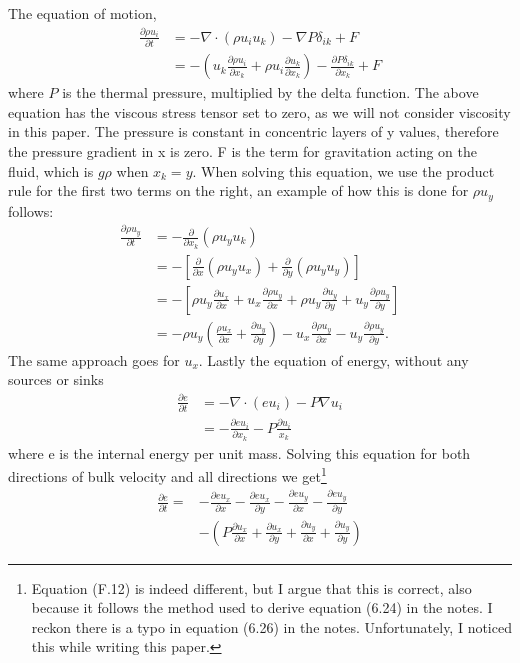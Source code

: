 \documentclass[a4paper,10pt]{article}
\begin{document}
The equation of motion, 
%
\begin{align}\label{eq:cons_motion}
\frac{\partial \rho u_i}{\partial t} &= -\nabla \cdot \left(\rho u_i u_k\right) - \nabla P\delta_{ik} + F \nonumber \\
&= -\left( u_k \frac{\partial \rho u_i}{\partial x_k} + \rho u_i \frac{\partial u_k}{\partial x_k} \right) -\frac{\partial P\delta_{ik}}{\partial x_k} + F
\end{align}
%
where $P$ is the thermal pressure, multiplied by the delta function. The above equation has the viscous stress tensor set to zero, as we will not consider viscosity in this paper. The pressure is constant in concentric layers of y values, therefore the pressure gradient in x is zero. F is the term for gravitation acting on the fluid, which is $g\rho$ when $x_k = y$. When solving this equation, we use the product rule for the first two terms on the right, an example of how this is done for $\rho u_y$ follows:
%
\begin{align*}
\frac{\partial \rho u_y}{\partial t} &= -\frac{\partial}{\partial x_k}\left(\rho u_y u_k\right) \nonumber \\
 &= -\left[\frac{\partial}{\partial x}\left(\rho u_y u_x\right) + \frac{\partial }{\partial y}\left(\rho u_y u_y\right)\right] \nonumber \\
 &= -\left[\rho u_y \frac{\partial u_x}{\partial x} + u_x\frac{\partial \rho u_y}{\partial x} + \rho u_y \frac{\partial u_y}{\partial y} + u_y \frac{\partial \rho u_y}{\partial y}\right] \nonumber \\
 &= -\rho u_y\left(\frac{\rho u_x}{\partial x} + \frac{\partial u_y}{\partial y}\right) - u_x \frac{\partial \rho u_y}{\partial x} - u_y \frac{\partial \rho u_y}{\partial y}.
\end{align*}
%
The same approach goes for $u_x$. Lastly the equation of energy, without any sources or sinks
%
\begin{align}\label{eq:cons_energy}
\frac{\partial e}{\partial t} &= -\nabla \cdot \left(eu_i\right) - P\nabla u_i \nonumber \\
&= -\frac{\partial eu_i}{\partial x_k} - P\frac{\partial u_i}{x_k}
\end{align}
where e is the internal energy per unit mass. Solving this equation for both directions of bulk velocity and all directions we get\footnote{Equation (F.12) is indeed different, but I argue that this is correct, also because it follows the method used to derive equation (6.24) in the notes. I reckon there is a typo in equation (6.26) in the notes. Unfortunately, I noticed this while writing this paper.}
%
\begin{align}
\frac{\partial e}{\partial t} = &-\frac{\partial eu_x}{\partial x} - \frac{\partial eu_x}{\partial y} - \frac{\partial eu_y}{\partial x} - \frac{\partial eu_y}{\partial y} \nonumber \\
&- \left(P\frac{\partial u_x}{\partial x} + \frac{\partial u_x}{\partial y} + \frac{\partial u_y}{\partial x} + \frac{\partial u_y}{\partial y}\right) 
\end{align}
\end{document}
